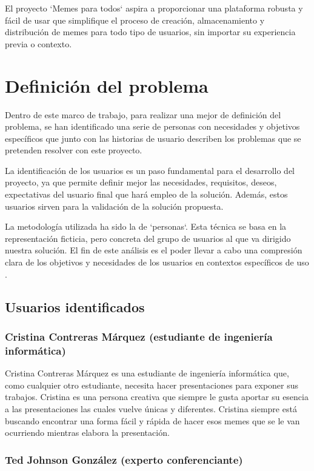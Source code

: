 El proyecto `Memes para todos` aspira a proporcionar una plataforma robusta y fácil de usar que simplifique el proceso de creación, almacenamiento y distribución de memes para todo tipo de usuarios, sin importar su experiencia previa o contexto.

\section{Definición del problema}

Dentro de este marco de trabajo, para realizar una mejor de definición del problema, se han identificado una serie de personas con necesidades y objetivos específicos que junto con las historias de usuario describen los problemas que se pretenden resolver con este proyecto.

La identificación de los usuarios es un paso fundamental para el desarrollo del proyecto, ya que permite definir mejor las necesidades, requisitos, deseos, expectativas del usuario final que hará empleo de la solución. Además, estos usuarios sirven para la validación de la solución propuesta.

La metodología utilizada ha sido la de `personas`. Esta técnica se basa en la representación ficticia, pero concreta del grupo de usuarios al que va dirigido nuestra solución. El fin de este análisis es el poder llevar a cabo una compresión clara de los objetivos y necesidades de los usuarios en contextos específicos de uso \cite{cooper2014face}.

\subsection{Usuarios identificados}

    \subsubsection{Cristina Contreras Márquez (estudiante de ingeniería informática)}

    Cristina Contreras Márquez es una estudiante de ingeniería informática que, como cualquier otro estudiante, necesita hacer presentaciones para exponer sus trabajos. Cristina es una persona creativa que siempre le gusta aportar su esencia a las presentaciones las cuales vuelve únicas y diferentes. Cristina siempre está buscando encontrar una forma fácil y rápida de hacer esos memes que se le van ocurriendo mientras elabora la presentación.

    \subsubsection{Ted Johnson González (experto conferenciante)}

